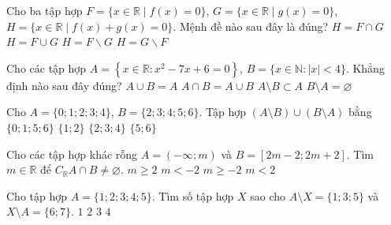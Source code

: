 \begin{ex}%
	 Cho ba tập hợp
	 $F=\{x\in \mathbb{R}\mid f(x)=0\}$, $G=\{x\in \mathbb{R}\mid g(x)=0\}$, $H=\{x\in \mathbb{R}\mid f(x)+g(x)=0\}$. Mệnh đề nào sau đây là đúng?
	\choice 
		{$H=F\cap G$} 
		{$H=F\cup G$} 
		{\True $H=F\backslash G$} 
		{$H=G\backslash  F$}
\end{ex}

\begin{ex}%
	Cho các tập hợp $A=\left\{x \in \mathbb{R}: x^2-7x+6=0\right\}$, $B=\{x \in \mathbb{N}:|x|<4\}$. Khẳng định nào  sau đây đúng?
	\choice 
		{$A \cup B=A$} 
		{$A \cap B=A \cup  B$}
		{\True $A \setminus B \subset A$} 
		{$B  \setminus A=\varnothing$}
\end{ex}

\begin{ex}%
	Cho $A=\{0; 1; 2; 3; 4\}$, $B=\{2; 3; 4; 5; 6\}$. Tập hợp  $(A \setminus B) \cup (B \setminus A)$ bằng
	 \choice
		{\True  $\{0; 1; 5; 6\}$}
		 {$\{1; 2\}$}
		{$\{2; 3;  4\}$}
		{$\{5; 6\}$} 
\end{ex}

\begin{ex}%
	Cho các tập hợp khác rỗng $A=(-\infty; m)$ và $B=[2m-2; 2m+2]$. Tìm $m \in \mathbb{R}$  để $C_{\mathbb{R}} A\cap B\neq \varnothing$.
	 \choice
		{$m \geq  2$}
		 {$m <-2$}
		 {\True $m \geq-2$}
		{$m <  2$}
	\loigiai{ 
		Ta có $C_{\mathbb{R}} A=[m;+\infty)$.\\ 
		Để $C_{\mathbb{R}} A\cap B\neq \varnothing \Leftrightarrow 2m+2\geq m \Leftrightarrow m  \geq-2$.
	} 
\end{ex}

\begin{ex}%
	 Cho tập hợp $A=\{1; 2; 3; 4; 5\}$. Tìm số tập hợp $X$ sao cho $A \setminus X=\{1; 3; 5\}$ và $X \setminus A=\{6; 7\}$.
	\choice 
		{\True $1$} 
		 {$2$}
		{$3$} 
		 {$4$}
\end{ex}


